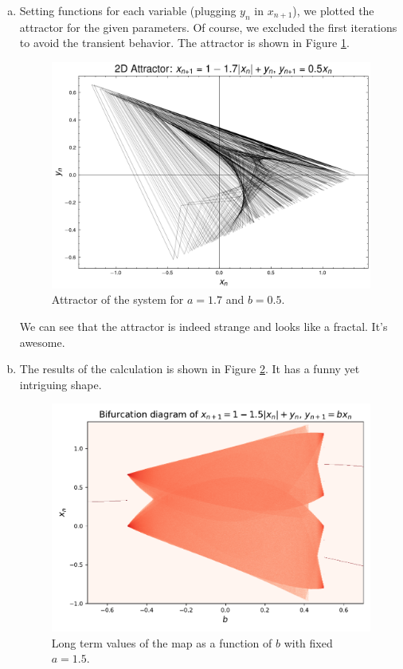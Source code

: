 \begin{enumerate}[(a)]
    \item Setting functions for each variable (plugging $y_{n}$ in $x_{n+1}$), we plotted the attractor for the given parameters. Of course,
    we excluded the first iterations to avoid the transient behavior. The attractor is shown in Figure \ref{fig:2a}.
    \begin{figure}[!ht]
        \centering
        \includegraphics[scale=0.70]{images/two_dim_map.png}
        \caption{Attractor of the system for $a=1.7$ and $b=0.5$.}
        \label{fig:2a}
    \end{figure}

    \newpage
    We can see that the attractor is indeed strange and looks like a fractal. It's awesome.
    \item The results of the calculation is shown in Figure \ref{fig:2b}. It has a funny yet intriguing shape.
    
    \begin{figure}[!ht]
        \centering
        \includegraphics[scale=0.70]{images/TWO-MAP-REDS.pdf}
        \caption{Long term values of the map as a function of $b$ with fixed $a=1.5$.}
        \label{fig:2b}
    \end{figure}


\end{enumerate}
